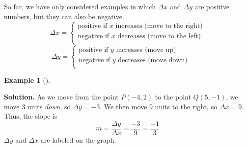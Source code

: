 \documentclass[10pt,]{book}
\theoremstyle{plain}
\theoremstyle{definition}
\theoremstyle{definition}
\newtheorem{example}[theorem]{Example}
\numberwithin{equation}{section}
\newcounter{figstack}
\newcounter{figindex}
\newlength\fight
\newcommand\pushValignCaptionBottom[5][b]{%
\stepcounter{figstack}%
\expandafter\def\csname %
figalign\romannumeral\value{figstack}\endcsname{#1}%
\expandafter\def\csname %
figtype\romannumeral\value{figstack}\endcsname{#2}%
\expandafter\def\csname %
figwd\romannumeral\value{figstack}\endcsname{#3}%
\expandafter\def\csname %
figcontent\romannumeral\value{figstack}\endcsname{#4}%
\expandafter\def\csname %
figcap\romannumeral\value{figstack}\endcsname{#5}%
\setbox0=\hbox{%
\begin{#2}{#3}#4\end{#2}}%
\ifdim\dimexpr\ht0+\dp0\relax>\fight\global\setlength{\fight}{%
\dimexpr\ht0+\dp0\relax}\fi%
}
\newcommand\popValignCaptionBottom{%
\setcounter{figindex}{0}%
\hfill%
\whiledo{\value{figindex}<\value{figstack}}{%
\stepcounter{figindex}%
\def\tmp{\csname figwd\romannumeral\value{figindex}\endcsname}%
\begin{\csname figtype\romannumeral\value{figindex}\endcsname}[t]{\tmp}%
\centering%
\stackinset{c}{}%
{\csname figalign\romannumeral\value{figindex}\endcsname}{}%
{\csname figcontent\romannumeral\value{figindex}\endcsname}%
{\rule{0pt}{\fight}}\par%
\csname figcap\romannumeral\value{figindex}\endcsname%
\end{\csname figtype\romannumeral\value{figindex}\endcsname}%
\hfill%
}%
\setcounter{figstack}{0}%
\setlength{\fight}{0pt}%
\hfill%
}
\begin{document}
    So far, we have only considered examples in which \(\Delta x\) and \(\Delta y\) are positive numbers, but they can also be negative.
    \begin{equation*}\Delta x = \begin{cases}
        \text{positive if } x \text{ increases (move to the right)}\\
        \text{negative if } x \text{ decreases (move to the left)}\\
        \end{cases}
    \end{equation*}
    \begin{equation*}\Delta y = \begin{cases}
        \text{positive if } y \text{ increases (move up)}\\
        \text{negative if } y \text{ decreases (move down)}~~~~~~~~~\\
        \end{cases}
    \end{equation*}
%
\begin{example}[]\label{example-negative-slope}
\leavevmode%
\par\medskip\noindent%
\textbf{Solution.}\quad 
        As we move from the point \(P(−4, 2)\) to the point \(Q(5, −1)\), we move \(3\) units \emph{down}, so \(\Delta y = −3\). We then move \(9\) units to the right, so \(\Delta x = 9\).
        Thus, the slope is
        \begin{equation*}m = \frac{\Delta y}{\Delta x}=\frac{-3}{9}=\frac{-1}{3}\end{equation*}\(\Delta y\) and \(\Delta x\) are labeled on the graph.
    \end{example}
\end{document}
